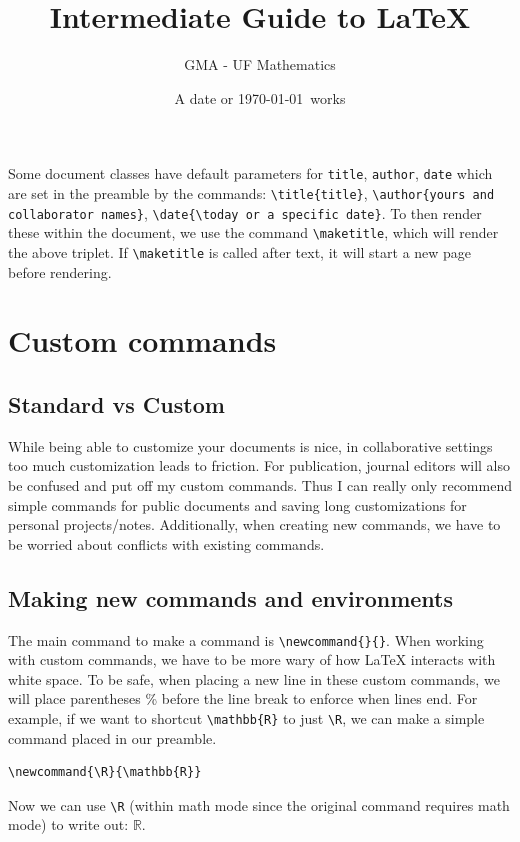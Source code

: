 \documentclass[]{article}
\title{Intermediate Guide to LaTeX}
\author{GMA - UF Mathematics}
\date{A date or \today\ works}
\newcommand{\R}{\mathbb{R}}
\begin{document}
\maketitle
Some document classes have default parameters for \verb|title|, \verb|author|, \verb|date| which are set in the preamble by the commands: \verb|\title{title}|, \verb|\author{yours and collaborator names}|, \verb|\date{\today or a specific date}|. To then render these within the document, we use the command \verb|\maketitle|, which will render the above triplet. If \verb|\maketitle| is called after text, it will start a new page before rendering.

\section{Custom commands}
\subsection{Standard vs Custom}
While being able to customize your documents is nice, in collaborative settings too much customization leads to friction. For publication, journal editors will also be confused and put off my custom commands. Thus I can really only recommend simple commands for public documents and saving long customizations for personal projects/notes. Additionally, when creating new commands, we have to be worried about conflicts with existing commands.

\subsection{Making new commands and environments}
The main command to make a command is \verb|\newcommand{}{}|. When working with custom commands, we have to be more wary of how LaTeX interacts with white space. To be safe, when placing a new line in these custom commands, we will place parentheses \% before the line break to enforce when lines end. For example, if we want to shortcut \verb|\mathbb{R}| to just \verb|\R|, we can make a simple command placed in our preamble.
\begin{verbatim}
\newcommand{\R}{\mathbb{R}}
\end{verbatim}
Now we can use \verb|\R| (within math mode since the original command requires math mode) to write out: $\R$.
\end{document}
